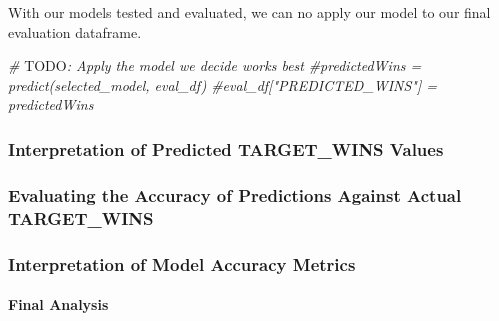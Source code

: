 \documentclass[
]{article}
\newenvironment{Shaded}{\begin{snugshade}}{\end{snugshade}}
\newcommand{\AlertTok}[1]{\textcolor[rgb]{0.94,0.16,0.16}{#1}}
\newcommand{\CommentTok}[1]{\textcolor[rgb]{0.56,0.35,0.01}{\textit{#1}}}
\begin{document}
With our models tested and evaluated, we can no apply our model to our
final evaluation dataframe.

\begin{Shaded}
\begin{Highlighting}[]
\CommentTok{\# }\AlertTok{TODO}\CommentTok{: Apply the model we decide works best}
\CommentTok{\#predictedWins = predict(selected\_model, eval\_df)}
\CommentTok{\#eval\_df["PREDICTED\_WINS"] = predictedWins}
\end{Highlighting}
\end{Shaded}

\subsubsection{Interpretation of Predicted TARGET\_WINS
Values}\label{interpretation-of-predicted-target_wins-values-1}

\subsubsection{Evaluating the Accuracy of Predictions Against Actual
TARGET\_WINS}\label{evaluating-the-accuracy-of-predictions-against-actual-target_wins-1}

\subsubsection{Interpretation of Model Accuracy
Metrics}\label{interpretation-of-model-accuracy-metrics-1}

\paragraph{Final Analysis}\label{final-analysis-1}
\end{document}
